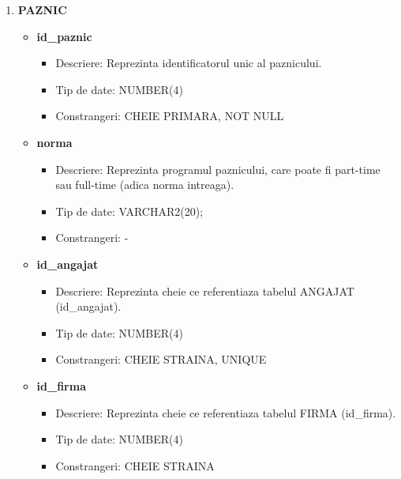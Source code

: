 \begin{enumerate}
\begin{itemize}
    \end{itemize}

    \vspace{0.5cm}

    \item \textbf{PAZNIC}
    \begin{itemize}
    
        \item \textbf{id\_paznic}
                \begin{itemize}
                    \item Descriere: Reprezinta identificatorul unic al paznicului.
                    \item Tip de date: NUMBER(4)
                    \item Constrangeri: CHEIE PRIMARA, NOT NULL
                \end{itemize}

        \item \textbf{norma}
                \begin{itemize}
                    \item Descriere: Reprezinta programul paznicului, care poate fi part-time sau full-time (adica norma intreaga).
                    \item Tip de date: VARCHAR2(20);
                    \item Constrangeri: -
                \end{itemize}
                
       \item \textbf{id\_angajat}
                \begin{itemize}
                    \item Descriere: Reprezinta cheie ce referentiaza tabelul ANGAJAT (id\_angajat).
                    \item Tip de date: NUMBER(4)
                    \item Constrangeri: CHEIE STRAINA, UNIQUE
                \end{itemize}

        \item \textbf{id\_firma}
                \begin{itemize}
                    \item Descriere: Reprezinta cheie ce referentiaza tabelul FIRMA (id\_firma).
                    \item Tip de date: NUMBER(4)
                    \item Constrangeri: CHEIE STRAINA
                \end{itemize}


\end{itemize}
\end{enumerate}
